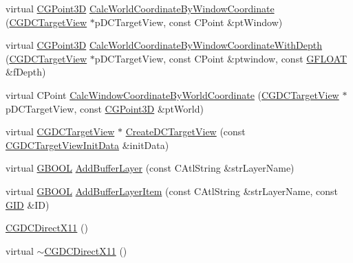 \begin{DoxyCompactItemize}
\item 
virtual \hyperlink{class_c_g_point3_d}{C\+G\+Point3\+D} \hyperlink{class_c_g_d_c_direct_x11_a35ffa13a9749e751c2bc2fdd261295ec}{Calc\+World\+Coordinate\+By\+Window\+Coordinate} (\hyperlink{class_c_g_d_c_target_view}{C\+G\+D\+C\+Target\+View} $\ast$p\+D\+C\+Target\+View, const C\+Point \&pt\+Window)
\item 
virtual \hyperlink{class_c_g_point3_d}{C\+G\+Point3\+D} \hyperlink{class_c_g_d_c_direct_x11_a28754d0645482e8e46ffe94c92bf3130}{Calc\+World\+Coordinate\+By\+Window\+Coordinate\+With\+Depth} (\hyperlink{class_c_g_d_c_target_view}{C\+G\+D\+C\+Target\+View} $\ast$p\+D\+C\+Target\+View, const C\+Point \&ptwindow, const \hyperlink{_g_types_8h_abf6eba8223df62f199b811a6c52ff2ef}{G\+F\+L\+O\+A\+T} \&f\+Depth)
\item 
virtual C\+Point \hyperlink{class_c_g_d_c_direct_x11_a965e409b82c2d437dbd9c9b589f69455}{Calc\+Window\+Coordinate\+By\+World\+Coordinate} (\hyperlink{class_c_g_d_c_target_view}{C\+G\+D\+C\+Target\+View} $\ast$p\+D\+C\+Target\+View, const \hyperlink{class_c_g_point3_d}{C\+G\+Point3\+D} \&pt\+World)
\item 
virtual \hyperlink{class_c_g_d_c_target_view}{C\+G\+D\+C\+Target\+View} $\ast$ \hyperlink{class_c_g_d_c_direct_x11_adf953ed79d9c2d1ab225459d0ca7fdb0}{Create\+D\+C\+Target\+View} (const \hyperlink{class_c_g_d_c_target_view_init_data}{C\+G\+D\+C\+Target\+View\+Init\+Data} \&init\+Data)
\item 
virtual \hyperlink{_g_types_8h_a2901915743626352a6820c5405f556dc}{G\+B\+O\+O\+L} \hyperlink{class_c_g_d_c_direct_x11_a142f985928e4119dae95b89f7946124a}{Add\+Buffer\+Layer} (const C\+Atl\+String \&str\+Layer\+Name)
\item 
virtual \hyperlink{_g_types_8h_a2901915743626352a6820c5405f556dc}{G\+B\+O\+O\+L} \hyperlink{class_c_g_d_c_direct_x11_ab9c4fdf364a6b2a539b2957536eba723}{Add\+Buffer\+Layer\+Item} (const C\+Atl\+String \&str\+Layer\+Name, const \hyperlink{_g_types_8h_a5b96ecb16d8e437977d12cd40aa6f6d8}{G\+I\+D} \&I\+D)
\item 
\hyperlink{class_c_g_d_c_direct_x11_a5b0b413358f5c3a241f8479dc484ab48}{C\+G\+D\+C\+Direct\+X11} ()
\item 
virtual \hyperlink{class_c_g_d_c_direct_x11_aef57e7c39f4c463ac7bc797b6ae06db1}{$\sim$\+C\+G\+D\+C\+Direct\+X11} ()
\end{DoxyCompactItemize}
